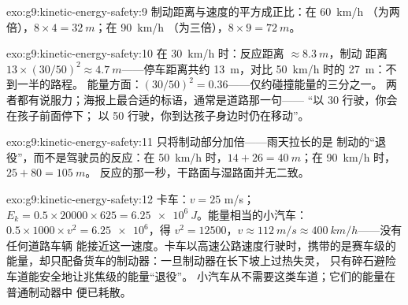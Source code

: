\begin{solution}{exo:g9:kinetic-energy-safety:9}
制动距离与速度的平方成正比：在 \qty{60}{km/h}
（为两倍），$8 \times 4 = \qty{32}{m}$；在 \qty{90}{km/h}
（为三倍），$8 \times 9 = \qty{72}{m}$。
\end{solution}

\begin{solution}{exo:g9:kinetic-energy-safety:10}
在 \qty{30}{km/h} 时：反应距离 $\approx \qty{8.3}{m}$，制动
距离 $13 \times (30/50)^2 \approx \qty{4.7}{m}$——停车距离共约
\qty{13}{m}，对比 \qty{50}{km/h} 时的 \qty{27}{m}：不到一半的路程。
能量方面：$(30/50)^2 = 0.36$——仅约碰撞能量的三分之一。
两者都有说服力；海报上最合适的标语，通常是道路那一句——
“以 30 行驶，你会在孩子前面停下；
以 50 行驶，你到达孩子身边时仍在移动”。
\end{solution}

\begin{solution}{exo:g9:kinetic-energy-safety:11}
只将制动部分加倍——雨天拉长的是
制动的“退役”，而不是驾驶员的反应：在 \qty{50}{km/h} 时，$14 + 26 =
\qty{40}{m}$；在 \qty{90}{km/h} 时，$25 + 80 = \qty{105}{m}$。
反应的那一秒，干路面与湿路面并无二致。
\end{solution}

\begin{solution}{exo:g9:kinetic-energy-safety:12}
卡车：$v = 25$ \unit{m/s}；$E_k = 0.5 \times 20000 \times
625 = \qty{6.25e6}{J}$。能量相当的小汽车：$0.5 \times 1000 \times
v^2 = \num{6.25e6}$，得 $v^2 = 12500$，$v \approx
\qty{112}{m/s} \approx \qty{400}{km/h}$——没有任何道路车辆
能接近这一速度。卡车以高速公路速度行驶时，携带的是赛车级的
能量，却只配备货车的制动器：一旦制动器在长下坡上过热失灵，
只有碎石避险车道能安全地让兆焦级的能量“退役”。
小汽车从不需要这类车道；它们的能量在普通制动器中
便已耗散。
\end{solution}


